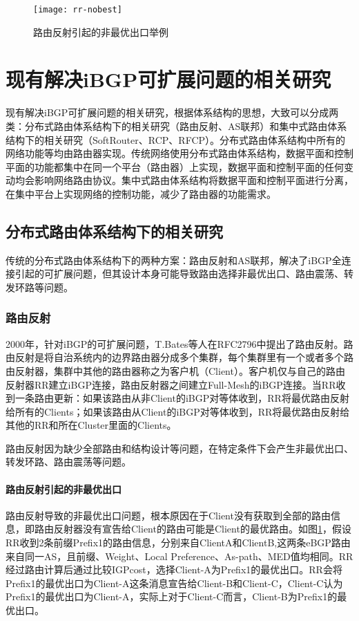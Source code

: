 \begin{figure}
  \centering
  \texttt{[image: rr-nobest]}
  \caption{路由反射引起的非最优出口举例\cite{Feamster2004The}}
  \label{fig:rr-nobest}
\end{figure}

\section{现有解决iBGP可扩展问题的相关研究}
现有解决iBGP可扩展问题的相关研究，根据体系结构的思想，大致可以分成两类：分布式路由体系结构下的相关研究（路由反射\cite{rfc2796}、AS联邦\cite{rfc1965}）和集中式路由体系结构下的相关研究（SoftRouter\cite{lakshman2004}、RCP\cite{Feamster2004The}、RFCP\cite{RothenbergHotSDN}）。分布式路由体系结构中所有的网络功能等均由路由器实现。传统网络使用分布式路由体系结构，数据平面和控制平面的功能都集中在同一个平台（路由器）上实现，数据平面和控制平面的任何变动均会影响网络路由协议。集中式路由体系结构\cite{centralization}将数据平面和控制平面进行分离，在集中平台上实现网络的控制功能，减少了路由器的功能需求。

\subsection{分布式路由体系结构下的相关研究}
传统的分布式路由体系结构下的两种方案：路由反射和AS联邦，解决了iBGP全连接引起的可扩展问题，但其设计本身可能导致路由选择非最优出口、路由震荡、转发环路等问题。

\subsubsection{路由反射\cite{rfc2796}}
\label{subsubsec:rr}
2000年，针对iBGP的可扩展问题，T.Bates等人在RFC2796\cite{rfc2796}中提出了路由反射。路由反射是将自治系统内的边界路由器分成多个集群，每个集群里有一个或者多个路由反射器，集群中其他的路由器称之为客户机（Client）。客户机仅与自己的路由反射器RR建立iBGP连接，路由反射器之间建立Full-Mesh的iBGP连接。当RR收到一条路由更新：如果该路由从非Client的iBGP对等体收到，RR将最优路由反射给所有的Clients；如果该路由从Client的iBGP对等体收到，RR将最优路由反射给其他的RR和所在Cluster里面的Clients。



路由反射因为缺少全部路由和结构设计等问题，在特定条件下会产生非最优出口、转发环路、路由震荡等问题。


\paragraph{路由反射引起的非最优出口}
路由反射导致的非最优出口问题，根本原因在于Client没有获取到全部的路由信息，即路由反射器没有宣告给Client的路由可能是Client的最优路由。如图\ref{fig:rr-nobest}，假设RR收到2条前缀Prefix1的路由信息，分别来自ClientA和ClientB,这两条eBGP路由来自同一AS，且前缀、Weight、Local Preference、As-path、MED值均相同。RR经过路由计算后通过比较IGPcost，选择Client-A为Prefix1的最优出口。RR会将Prefix1的最优出口为Client-A这条消息宣告给Client-B和Client-C，Client-C认为Prefix1的最优出口为Client-A，实际上对于Client-C而言，Client-B为Prefix1的最优出口。

